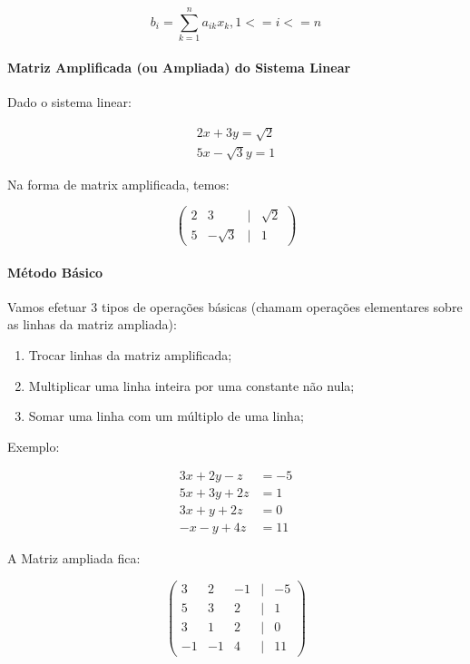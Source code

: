 \documentclass[12pt,a4paper]{article}
\begin{document}
\begin{equation}
b_i = \sum_{k=1}^{n} a_{ik} x_k, 1 <= i <= n
\end{equation}

\paragraph{Matriz Amplificada (ou Ampliada) do Sistema Linear}

Dado o sistema linear:

\begin{align*}
2x + 3y = \sqrt{2}\\
5x - \sqrt{3}y = 1
\end{align*}

Na forma de matrix amplificada, temos:

\[
\begin{pmatrix}
2 & 3 & | & \sqrt{2}\\
5 & -\sqrt{3} & | & 1
\end{pmatrix}
\]


\paragraph{Método Básico}

Vamos efetuar 3 tipos de operações básicas (chamam operações elementares sobre as linhas da matriz ampliada):

\begin{enumerate}
	\item Trocar linhas da matriz amplificada;
	\item Multiplicar uma linha inteira por uma constante não nula;
	\item Somar uma linha com um múltiplo de uma linha;
\end{enumerate}

Exemplo:

\begin{align*}
3x + 2y - z &= -5\\
5x + 3y + 2z &= 1\\
3x + y + 2z &= 0\\
-x -y + 4z &= 11
\end{align*}

A Matriz ampliada fica:

\[
\begin{pmatrix}
3 & 2 & -1 & | & -5\\
5 & 3 & 2 & | & 1\\
3 & 1 & 2 & | & 0\\
-1 & -1 & 4 & | & 11
\end{pmatrix}
\]
\end{document}
